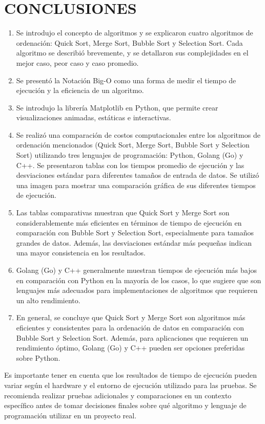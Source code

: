 \documentclass{article}
\begin{document}

\section{CONCLUSIONES}
\begin{enumerate}
  \item Se introdujo el concepto de algoritmos y se explicaron cuatro algoritmos de ordenación: Quick Sort, Merge Sort, Bubble Sort y Selection Sort. Cada algoritmo se describió brevemente, y se detallaron sus complejidades en el mejor caso, peor caso y caso promedio.
  \item Se presentó la Notación Big-O como una forma de medir el tiempo de ejecución y la eficiencia de un algoritmo.
  \item Se introdujo la librería Matplotlib en Python, que permite crear visualizaciones animadas, estáticas e interactivas.
  \item Se realizó una comparación de costos computacionales entre los algoritmos de ordenación mencionados (Quick Sort, Merge Sort, Bubble Sort y Selection Sort) utilizando tres lenguajes de programación: Python, Golang (Go) y C++. Se presentaron tablas con los tiempos promedio de ejecución y las desviaciones estándar para diferentes tamaños de entrada de datos. Se utilizó una imagen para mostrar una comparación gráfica de sus diferentes tiempos de ejecución.
  \item Las tablas comparativas muestran que Quick Sort y Merge Sort son considerablemente más eficientes en términos de tiempo de ejecución en comparación con Bubble Sort y Selection Sort, especialmente para tamaños grandes de datos. Además, las desviaciones estándar más pequeñas indican una mayor consistencia en los resultados.
  \item Golang (Go) y C++ generalmente muestran tiempos de ejecución más bajos en comparación con Python en la mayoría de los casos, lo que sugiere que son lenguajes más adecuados para implementaciones de algoritmos que requieren un alto rendimiento.
  \item En general, se concluye que Quick Sort y Merge Sort son algoritmos más eficientes y consistentes para la ordenación de datos en comparación con Bubble Sort y Selection Sort. Además, para aplicaciones que requieren un rendimiento óptimo, Golang (Go) y C++ pueden ser opciones preferidas sobre Python.
\end{enumerate}
Es importante tener en cuenta que los resultados de tiempo de ejecución pueden variar según el hardware y el entorno de ejecución utilizado para las pruebas. Se recomienda realizar pruebas adicionales y comparaciones en un contexto específico antes de tomar decisiones finales sobre qué algoritmo y lenguaje de programación utilizar en un proyecto real.
\end{document}
